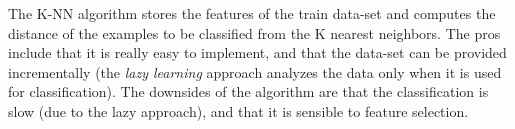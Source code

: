 The K-NN algorithm stores the features of the train data-set and computes the distance of the examples to be classified from the K nearest neighbors. The pros include that it is really easy to implement, and that the data-set can be provided incrementally (the \textit{lazy learning} approach analyzes the data only when it is used for classification). The downsides of the algorithm are that the classification is slow (due to the lazy approach), and that it is sensible to feature selection.